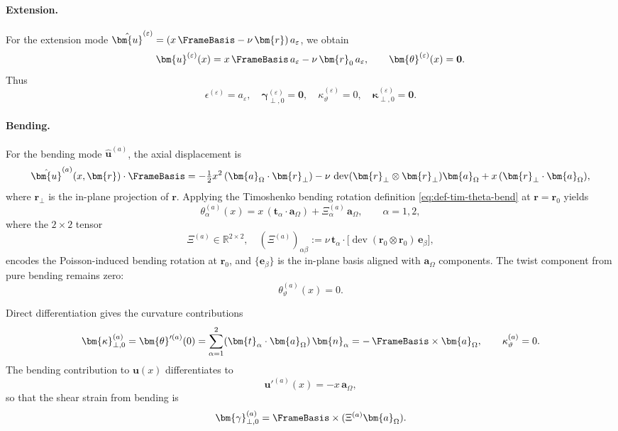 \paragraph{Extension.}

For the extension mode
$\hat{\bm{u}}^{(\varepsilon)} = (x\,\FrameBasis - \nu\,\bm{r})\,a_\varepsilon$,
we obtain
\begin{equation}
\bm{u}^{(\varepsilon)}(x) = x\,\FrameBasis\,a_\varepsilon - \nu\,\bm{r}_0\,a_\varepsilon,
\qquad
\bm{\theta}^{(\varepsilon)}(x) = \mathbf{0}.
\end{equation}
Thus
\begin{equation}
\epsilon^{(\varepsilon)} = a_\varepsilon,
\quad
\bm{\gamma}_{\perp,0}^{(\varepsilon)} = \mathbf{0},
\quad
\kappa_\vartheta^{(\varepsilon)} = 0,
\quad
\bm{\kappa}_{\perp,0}^{(\varepsilon)} = \mathbf{0}.
\end{equation}

\paragraph{Bending.}

For the bending mode $\hat{\bm{u}}^{(a)}$, the axial displacement is
\[
\hat{\bm{u}}^{(a)}(x,\bm{r})\cdot\FrameBasis
=
-\tfrac{1}{2}x^2\,(\bm{a}_\Omega\cdot\bm{r}_\perp)
- \nu\,\operatorname{dev}(\bm{r}_\perp\otimes\bm{r}_\perp)\bm{a}_\Omega
+ x\,(\bm{r}_\perp\cdot\bm{a}_\Omega),
\]
where $\bm{r}_\perp$ is the in-plane projection of $\bm{r}$. Applying the 
Timoshenko bending rotation definition \eqref{eq:def-tim-theta-bend} at 
$\bm{r}=\bm{r}_0$ yields
\begin{equation}
\theta_\alpha^{(a)}(x)
=
x\,(\bm{t}_\alpha\cdot\bm{a}_\Omega)
+ \Xi_{\alpha}^{(a)}\,\bm{a}_\Omega,
\qquad
\alpha=1,2,
\end{equation}
where the $2\times 2$ tensor
\begin{equation}
\Xi^{(a)} \in \mathbb{R}^{2\times 2},\quad
(\Xi^{(a)})_{\alpha\beta}
:=
\nu\,\bm{t}_\alpha\cdot 
\big[\operatorname{dev}(\bm{r}_0\otimes\bm{r}_0)\,\bm{e}_\beta\big],
\end{equation}
encodes the Poisson-induced bending rotation at $\bm{r}_0$, and 
$\{\bm{e}_\beta\}$ is the in-plane basis aligned with $\bm{a}_\Omega$ 
components. The twist component from pure bending remains zero:
\begin{equation}
\theta_\vartheta^{(a)}(x) = 0.
\end{equation}

Direct differentiation gives the curvature contributions
\begin{equation}
\bm{\kappa}_{\perp,0}^{(a)}
=
\bm{\theta}'^{(a)}(0)
=
\sum_{\alpha=1}^2 (\bm{t}_\alpha\cdot\bm{a}_\Omega)\,\bm{n}_\alpha
=
-\,\FrameBasis\times\bm{a}_\Omega,
\qquad
\kappa_\vartheta^{(a)} = 0.
\end{equation}
The bending contribution to $\bm{u}(x)$ differentiates to
\[
\bm{u}'^{(a)}(x)
=
- x\,\bm{a}_\Omega,
\]
so that the shear strain from bending is
\begin{equation}
\bm{\gamma}_{\perp,0}^{(a)}
=
\FrameBasis\times(\Xi^{(a)}\bm{a}_\Omega).
\end{equation}

